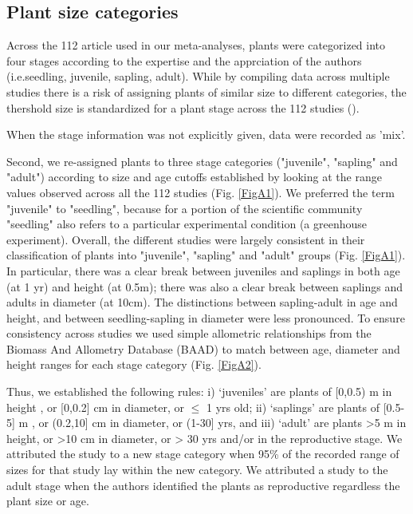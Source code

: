 \documentclass[a4paper]{article}\usepackage[]{graphicx}\usepackage[]{color}
\begin{document}
\subsection*{Plant size categories}\label{plant-size-categories}


Across the 112 article used in our meta-analyses, plants were categorized into four stages according to the expertise and the apprciation of the authors (i.e.seedling, juvenile, sapling, adult). 
While by compiling data across multiple studies there is a risk of assigning plants of similar size to different categories, the thershold size is standardized for a plant stage across the 112 studies ().

When the stage information was not explicitly given, data were recorded as 'mix'. 


Second, we re-assigned plants to three stage categories ("juvenile", "sapling" and "adult") according to size and age cutoffs established by looking at the range values observed across all the 112 studies (Fig. \ref{FigA1}). We preferred the term "juvenile" to "seedling", because for a portion of the scientific community "seedling" also refers to a particular experimental condition (a greenhouse experiment). Overall, the different studies were largely consistent in their classification of plants into "juvenile", "sapling" and "adult" groups  (Fig. \ref{FigA1}). In particular, there was a clear break between juveniles and saplings in both age (at 1 yr) and height (at 0.5m); there was also a clear break between saplings and adults in diameter (at 10cm). The distinctions between sapling-adult in age and height, and between seedling-sapling in diameter were less pronounced. To ensure consistency across studies we used simple allometric relationships from the Biomass And Allometry Database (BAAD) \citep{Falster:2015} to match between age, diameter and height ranges for each stage category (Fig. \ref{FigA2}). 

Thus, we established the following rules: i) `juveniles' are plants of {[}0,0.5) m in height , or {[}0,0.2{]} cm in diameter, or $\leq$ 1 yrs old; ii) `saplings' are plants of {[}0.5-5{]} m , or (0.2,10{]} cm in diameter, or (1-30{]} yrs, and iii) `adult' are plants \textgreater{}5 m in height, or \textgreater{}10 cm in diameter, or \textgreater{} 30 yrs and/or in the reproductive stage. We attributed the study to a new stage category when 95\% of the recorded range of sizes for that study lay within the new category. We attributed a study to the adult stage when the authors identified the plants as reproductive regardless the plant size or age. 
\end{document}
